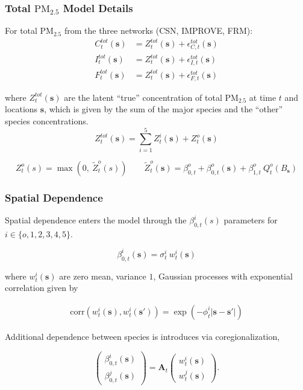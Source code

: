 \documentclass[t]{beamer}\usepackage[]{graphicx}\usepackage[]{color}
\newcommand{\PM}{$\text{PM}_{2.5}$ }
\begin{document}

\begin{frame}
\frametitle{Total \PM Model Details}

For total \PM from the three networks (CSN, IMPROVE, FRM):
%
\begin{align*}
C_t^{tot}(\bm{s}) &= Z_t^{tot}(\bm{s}) + \epsilon_{C,t}^{tot}(\bm{s}) \\
I_t^{tot}(\bm{s}) &= Z_t^{tot}(\bm{s}) + \epsilon_{I,t}^{tot}(\bm{s}) \\
F_t^{tot}(\bm{s}) &= Z_t^{tot}(\bm{s}) + \epsilon_{F,t}^{tot}(\bm{s})
\end{align*}

where $Z_t^{tot}(\bm{s})$ are the latent ``true'' concentration of total \PM at time $t$ and locations $\bm{s}$, which is given by the sum of the major species and the ``other'' species concentrations.
%
\[ Z^{tot}_{t}(\bm{s}) = \sum_{i=1}^{5} Z^i_t(\bm{s}) + Z^{o}_{t}(\bm{s}) \]

{\footnotesize
\[
{Z}_t^o(s) = \max{}\left(0,~\widetilde{Z}_t^o(s)\right) \qquad
\widetilde{Z}_t^{o}(\bm{s}) = \beta_{0,t}^o +\beta_{0,t}^o(\bm{s}) + \beta_{1,t}^o \: Q_t^o(B_{\bm{s}})
\]
}

\end{frame}


\begin{frame}
\frametitle{Spatial Dependence}

Spatial dependence enters the model through the $\beta_{0,t}^i(s)$ parameters for $i \in \{o,1,2,3,4,5\}$.

\[ \beta_{0,t}^i(\bm{s}) = {\sigma}^i_t~w^i_t(\bm{s}) \]

\vspace{5mm}

where $w^i_{t}(\bm{s})$ are zero mean, variance $1$, Gaussian processes with exponential correlation given by 

\begin{align*}
\text{corr}(w^i_{t}(\bm{s}),w^i_{t}(\bm{s}')) = \exp(-\phi^i_{t} |\bm{s}-\bm{s}'|)
\end{align*}

Additional dependence between species is introduces via coregionalization,

\[
 \left( \begin{array}{cc} \beta^i_{0,t}(\boldsymbol{s})\\ \beta^j_{0,t}(\boldsymbol{s}) \end{array} \right)
 = \boldsymbol{A}_t \left( \begin{array}{cc} w^i_t(\boldsymbol{s})\\ w^j_t(\boldsymbol{s}) \end{array} \right).
\]

\end{frame}
\end{document}
